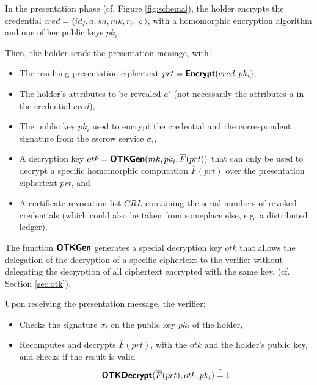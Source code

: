 In the presentation phase (cf. Figure \ref{fig:schema}), the holder encrypts the credential $cred =\langle id_I, a,  sn, mk, r_i, \varsigma\rangle$, with a homomorphic encryption algorithm and one of her public keys $pk_i$. 

Then, the holder sends the presentation message, with:
\begin{itemize}[noitemsep]
\item The resulting presentation ciphertext $prt = \textsf{\textbf{Encrypt}}(cred,pk_i)$,
\item The holder's attributes to be revealed $a'$ (not necessarily the attributes $a$ in the credential $cred$),
\item The public key $pk_i$ used to encrypt the credential and the correspondent signature from the escrow service $\sigma_i$,
\item A decryption key $otk=\textsf{\textbf{OTKGen}}(mk,pk_i,\overline{F}(prt))$ that can only be used to decrypt a specific homomorphic computation $\overline{F}(prt)$ over the presentation ciphertext $prt$, and
\item A certificate revocation list $CRL$ containing the serial numbers of revoked credentials (which could also be taken from someplace else, e.g. a distributed ledger).
\end{itemize}

The function $\textsf{\textbf{OTKGen}}$ generates a special decryption key $otk$ that allows the delegation of the decryption of a specific ciphertext to the verifier without delegating the decryption of all ciphertext encrypted with the same key. (cf. Section \ref{sec:otk}).

Upon receiving the presentation message, the verifier:
\begin{itemize}[noitemsep]
\item Checks the signature $\sigma_i$ on the public key $pk_i$ of the holder,
\item Recomputes and decrypts $\overline{F}(prt)$, with the $otk$ and the holder's public key,  and checks if the result is valid \[\textsf{\textbf{OTKDecrypt}}(\overline{F}(prt),otk,pk_i)\stackrel{?}{=}1\]
\end{itemize}

